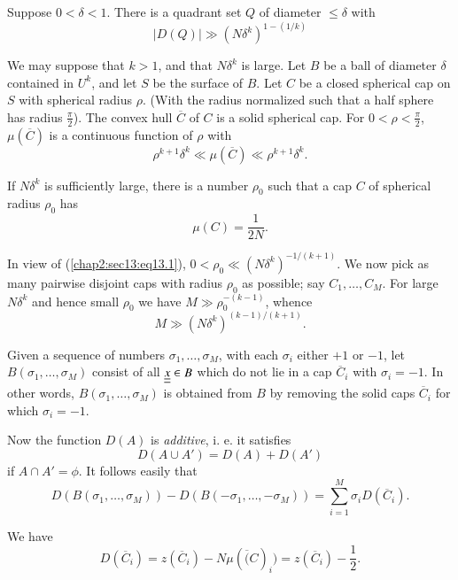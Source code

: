 \begin{theorem}\label{chap2:sec13:thm13B}
Suppose $0 < \delta < 1$. There is a quadrant set $Q$ of diameter $\leq \delta$ with
$$
|D(Q)| \gg (N \delta^{k})^{1-(1/k)}
$$
\end{theorem}

\medskip
{} We may suppose that $k > 1$, and that $N \delta^{k}$ is large. Let $B$ be a ball of diameter $\delta$ contained in $U^{k}$, and let $S$ be the surface of $B$. Let $C$ be a closed spherical cap on $S$ with spherical radius $\rho$. (With the radius normalized such that a half sphere has radius $\frac{\pi}{2}$). The convex hull $\overline{C}$ of $C$ is a solid spherical cap. For $0 < \rho < \frac{\pi}{2}$, $\mu(\overline{C})$ is a continuous function of $\rho$ with
\begin{equation*}
\rho^{k+1} \delta^{k} \ll \mu(\overline{C}) \ll \rho^{k+1} \delta^{k}.\tag{13.1}\label{chap2:sec13:eq13.1}
\end{equation*}\pageoriginale

If $N \delta^{k}$ is sufficiently large, there is a number $\rho_{0}$ such that a cap $C$ of spherical radius $\rho_{0}$ has
$$
\mu(C) = \frac{1}{2N}.
$$

In view of (\ref{chap2:sec13:eq13.1}), $0 < \rho_{0} \ll (N \delta^{k})^{-1/(k+1)}$. We now pick as many pairwise disjoint caps with radius $\rho_{0}$ as possible; say $C_{1}, \ldots, C_{M}$. For large $N \delta^{k}$ and hence small $\rho_{0}$ we have $M \gg \rho_{0}^{-(k-1)}$, whence
\begin{equation*}
M \gg (N \delta^{k})^{(k-1)/(k+1)}.\tag{13.2}\label{chap2:sec13:eq13.2}
\end{equation*}

Given a sequence of numbers $\sigma_{1}, \ldots, \sigma_{M}$, with each $\sigma_{i}$ either $+1$ or $-1$, let $B(\sigma_{1}, \ldots, \sigma_{M})$ consist of all $\underline{\underline{x}} \in B$ which do not lie in a cap $\overline{C}_{i}$ with $\sigma_{i} = -1$. In other words, $B(\sigma_{1}, \ldots, \sigma_{M})$ is obtained from $B$ by removing the solid caps $\overline{C}_{i}$ for which $\sigma_{i} = -1$.

Now the function $D(A)$ is {\em additive}, i. e. it satisfies
$$
D(A \cup A') = D(A) + D(A')
$$
if $A \cap A' = \phi$. It follows easily that
$$
D(B(\sigma_{1}, \ldots, \sigma_{M})) - D(B(-\sigma_{1}, \ldots, -\sigma_{M})) = \sum_{i=1}^{M} \sigma_{i} D(\overline{C}_{i}).
$$

We have
$$
D(\overline{C}_{i}) = z(\overline{C}_{i}) - N\mu(\overline(C)_{i}) = z(\overline{C}_{i}) - \frac{1}{2}.
$$

